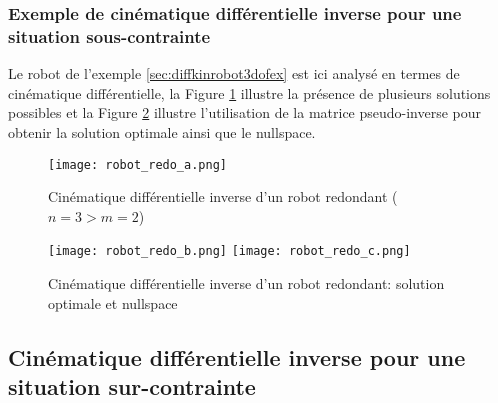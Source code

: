 \subsubsection{Exemple de cinématique différentielle inverse pour une situation sous-contrainte}


Le robot de l'exemple \ref{sec:diffkinrobot3dofex} est ici analysé en termes de cinématique différentielle, la Figure \ref{fig:robot_redo_a} illustre la présence de plusieurs solutions possibles et la Figure \ref{fig:robot_redo_c} illustre l'utilisation de la matrice pseudo-inverse pour obtenir la solution optimale ainsi que le nullspace.

\begin{figure}[H]
	\centering
	\texttt{[image: robot\_redo\_a.png]}
	\caption{Cinématique différentielle inverse d'un robot redondant ($n=3>m=2$)}
	\label{fig:robot_redo_a}
\end{figure}
%

\begin{figure}[H]
	\centering
	\texttt{[image: robot\_redo\_b.png]}
	\texttt{[image: robot\_redo\_c.png]}
	\caption{Cinématique différentielle inverse d'un robot redondant: solution optimale et nullspace}
	\label{fig:robot_redo_c}
\end{figure}




\newpage
\subsection{Cinématique différentielle inverse pour une situation sur-contrainte}
\label{sec:overconstraintrobot}

